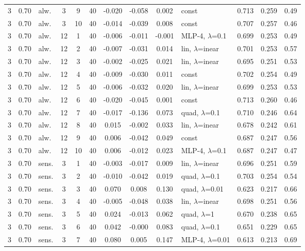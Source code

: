 \documentclass[10pt]{article}
\begin{document}
\begin{scriptsize}
\begin{longtable}{cclcc c ccc l ccc}
3 & 0.70 & alw. & 3 & 9 & 40 & -0.020 & -0.058 & 0.002 & const & 0.713 & 0.259 & 0.49 \\
3 & 0.70 & alw. & 3 & 10 & 40 & -0.014 & -0.039 & 0.008 & const & 0.707 & 0.257 & 0.46 \\
3 & 0.70 & alw. & 12 & 1 & 40 & -0.006 & -0.011 & -0.001 & MLP-4, $\lambda$=0.1 & 0.699 & 0.253 & 0.49 \\
3 & 0.70 & alw. & 12 & 2 & 40 & -0.007 & -0.031 & 0.014 & lin, $\lambda$=inear & 0.701 & 0.253 & 0.57 \\
3 & 0.70 & alw. & 12 & 3 & 40 & -0.002 & -0.025 & 0.021 & lin, $\lambda$=inear & 0.695 & 0.251 & 0.53 \\
3 & 0.70 & alw. & 12 & 4 & 40 & -0.009 & -0.030 & 0.011 & const & 0.702 & 0.254 & 0.49 \\
3 & 0.70 & alw. & 12 & 5 & 40 & -0.006 & -0.032 & 0.020 & lin, $\lambda$=inear & 0.699 & 0.253 & 0.53 \\
3 & 0.70 & alw. & 12 & 6 & 40 & -0.020 & -0.045 & 0.001 & const & 0.713 & 0.260 & 0.46 \\
3 & 0.70 & alw. & 12 & 7 & 40 & -0.017 & -0.136 & 0.073 & quad, $\lambda$=0.1 & 0.710 & 0.246 & 0.64 \\
3 & 0.70 & alw. & 12 & 8 & 40 & 0.015 & -0.002 & 0.033 & lin, $\lambda$=inear & 0.678 & 0.242 & 0.61 \\
3 & 0.70 & alw. & 12 & 9 & 40 & 0.006 & -0.042 & 0.049 & const & 0.687 & 0.247 & 0.56 \\
3 & 0.70 & alw. & 12 & 10 & 40 & 0.006 & -0.012 & 0.023 & MLP-4, $\lambda$=0.1 & 0.687 & 0.247 & 0.47 \\
3 & 0.70 & sens. & 3 & 1 & 40 & -0.003 & -0.017 & 0.009 & lin, $\lambda$=inear & 0.696 & 0.251 & 0.59 \\
3 & 0.70 & sens. & 3 & 2 & 40 & -0.010 & -0.042 & 0.019 & quad, $\lambda$=0.1 & 0.703 & 0.254 & 0.54 \\
3 & 0.70 & sens. & 3 & 3 & 40 & 0.070 & 0.008 & 0.130 & quad, $\lambda$=0.01 & 0.623 & 0.217 & 0.66 \\
3 & 0.70 & sens. & 3 & 4 & 40 & -0.005 & -0.048 & 0.038 & lin, $\lambda$=inear & 0.698 & 0.251 & 0.56 \\
3 & 0.70 & sens. & 3 & 5 & 40 & 0.024 & -0.013 & 0.062 & quad, $\lambda$=1 & 0.670 & 0.238 & 0.65 \\
3 & 0.70 & sens. & 3 & 6 & 40 & 0.042 & -0.000 & 0.083 & quad, $\lambda$=0.1 & 0.651 & 0.229 & 0.65 \\
3 & 0.70 & sens. & 3 & 7 & 40 & 0.080 & 0.005 & 0.147 & MLP-4, $\lambda$=0.01 & 0.613 & 0.213 & 0.69 \\

\end{longtable}
\end{scriptsize}
\end{document}
